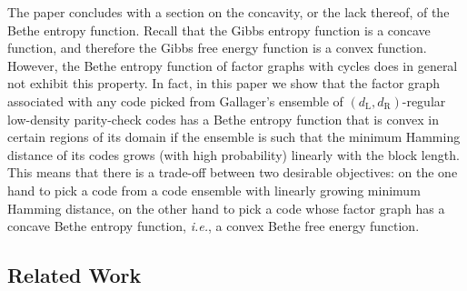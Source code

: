 \documentclass[journal, twocolumn]{IEEEtran}
\newcommand{\ie}{\emph{i.e.}}
\newcommand{\dleft}{d_{\mathrm{L}}}
\newcommand{\dright}{d_{\mathrm{R}}}
\newcommand{\?}{\mathrm{?}}
\begin{document}
The paper concludes with a section on the concavity, or the lack thereof, of
the Bethe entropy function. Recall that the Gibbs entropy function is a
concave function, and therefore the Gibbs free energy function is a convex
function. However, the Bethe entropy function of factor graphs with cycles
does in general not exhibit this property. In fact, in this paper we show that
the factor graph associated with any code picked from Gallager's ensemble of
$(\dleft,\dright)$-regular low-density parity-check codes has a Bethe entropy
function that is convex in certain regions of its domain if the ensemble is
such that the minimum Hamming distance of its codes grows (with high
probability) linearly with the block length. This means that there is a
trade-off between two desirable objectives: on the one hand to pick a code
from a code ensemble with linearly growing minimum Hamming distance, on the
other hand to pick a code whose factor graph has a concave Bethe entropy
function, \ie, a convex Bethe free energy function.



\subsection{Related Work}
\label{sec:related:work:1}
\end{document}
